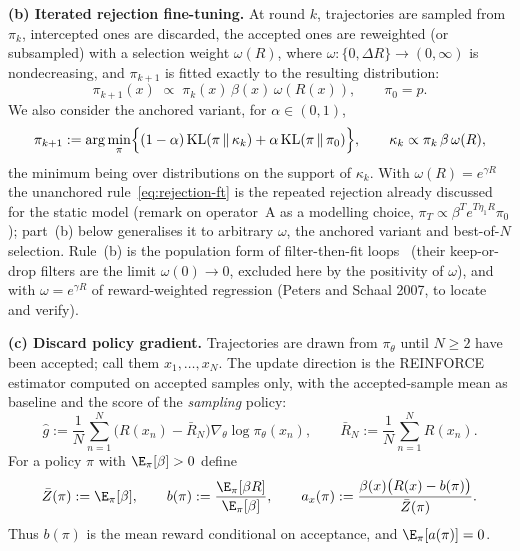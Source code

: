 \smallskip\noindent\textbf{(b) Iterated rejection fine-tuning.}
At round $k$, trajectories are sampled from $\pi_k$, intercepted ones are
discarded, the accepted ones are reweighted (or subsampled) with a
selection weight $\omega(R)$, where $\omega:\{0,\Delta R\}\to(0,\infty)$ is
nondecreasing, and $\pi_{k+1}$ is fitted exactly to the resulting
distribution:
\begin{equation}\label{eq:rejection-ft}
\pi_{k+1}(x)\;\propto\;\pi_k(x)\,\beta(x)\,\omega(R(x)),\qquad \pi_0=p .
\end{equation}
We also consider the anchored variant, for $\alpha\in(0,1)$,
\begin{equation}\label{eq:rejection-ft-anchored}
\pi_{k+1}:=\arg\min_{\pi}\Bigl\{(1-\alpha)\,\mathrm{KL}(\pi\,\|\,\kappa_k)
+\alpha\,\mathrm{KL}(\pi\,\|\,\pi_0)\Bigr\},
\qquad \kappa_k\propto\pi_k\,\beta\,\omega(R),
\end{equation}
the minimum being over distributions on the support of $\kappa_k$. With $\omega(R)=e^{\gamma R}$ the unanchored rule~\eqref{eq:rejection-ft} is the repeated rejection already discussed for the static model (remark on operator~A as a modelling choice, $\pi_T\propto\beta^T e^{T\eta_1R}\pi_0$); part~(b) below generalises it to arbitrary $\omega$, the anchored variant and best-of-$N$ selection. Rule~(b) is the population form of filter-then-fit loops~\cite{zelikman2022,dong2023raft,gulcehre2023rest} (their keep-or-drop filters are the limit $\omega(0)\to0$, excluded here by the positivity of $\omega$), and with $\omega=e^{\gamma R}$ of reward-weighted regression (Peters and Schaal 2007, to locate and verify).

\smallskip\noindent\textbf{(c) Discard policy gradient.}
Trajectories are drawn from $\pi_\theta$ until $N\ge 2$ have been accepted;
call them $x_1,\dots,x_N$. The update direction is the REINFORCE estimator
computed on accepted samples only, with the accepted-sample mean as
baseline and the score of the \emph{sampling} policy:
\begin{equation}\label{eq:discard-pg-estimator}
\hat g:=\frac1N\sum_{n=1}^N\bigl(R(x_n)-\bar R_N\bigr)\nabla_\theta\log\pi_\theta(x_n),
\qquad \bar R_N:=\frac1N\sum_{n=1}^N R(x_n).
\end{equation}
For a policy $\pi$ with $\E_\pi[\beta]>0$ define
\begin{equation}\label{eq:accepted-mean}
\bar Z(\pi):=\E_\pi[\beta],\qquad
b(\pi):=\frac{\E_\pi[\beta R]}{\E_\pi[\beta]},\qquad
a_x(\pi):=\frac{\beta(x)\bigl(R(x)-b(\pi)\bigr)}{\bar Z(\pi)} .
\end{equation}
Thus $b(\pi)$ is the mean reward conditional on acceptance, and
$\E_\pi[a(\pi)]=0$.

